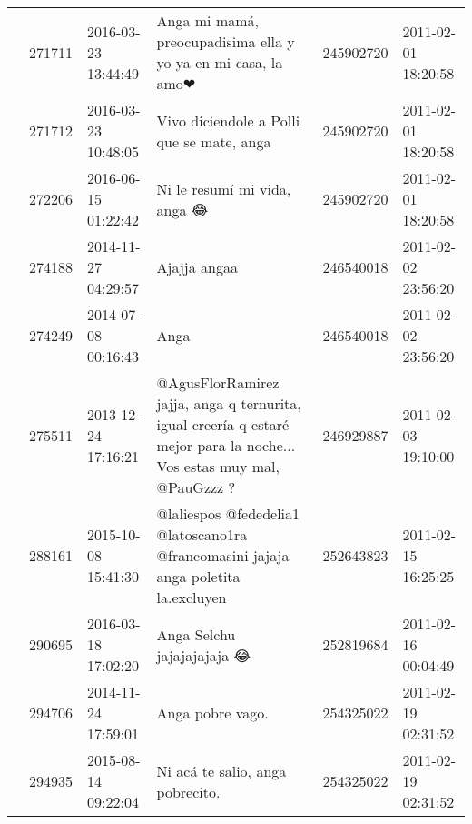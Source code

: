 \begin{tabular}{llllrl}
           & 271711  & 2016-03-23 13:44:49 &                                                                                Anga mi mamá, preocupadisima ella y yo ya en mi casa, la amo❤ &   245902720 & 2011-02-01 18:20:58 \\
           & 271712  & 2016-03-23 10:48:05 &                                                                                                    Vivo diciendole a Polli que se mate, anga &   245902720 & 2011-02-01 18:20:58 \\
           & 272206  & 2016-06-15 01:22:42 &                                                                                                                 Ni le resumí mi vida, anga 😂 &   245902720 & 2011-02-01 18:20:58 \\
           & 274188  & 2014-11-27 04:29:57 &                                                                                                                                 Ajajja angaa &   246540018 & 2011-02-02 23:56:20 \\
           & 274249  & 2014-07-08 00:16:43 &                                                                                                                                         Anga &   246540018 & 2011-02-02 23:56:20 \\
           & 275511  & 2013-12-24 17:16:21 &                        @AgusFlorRamirez jajja, anga q ternurita, igual creería q estaré mejor para la noche... Vos estas muy mal, @PauGzzz ? &   246929887 & 2011-02-03 19:10:00 \\
           & 288161  & 2015-10-08 15:41:30 &                                                          @laliespos @fededelia1 @latoscano1ra @francomasini jajaja anga poletita la.excluyen &   252643823 & 2011-02-15 16:25:25 \\
           & 290695  & 2016-03-18 17:02:20 &                                                                                                                   Anga Selchu jajajajajaja 😂 &   252819684 & 2011-02-16 00:04:49 \\
           & 294706  & 2014-11-24 17:59:01 &                                                                                                                             Anga pobre vago. &   254325022 & 2011-02-19 02:31:52 \\
           & 294935  & 2015-08-14 09:22:04 &                                                                                                             Ni acá te salio, anga pobrecito. &   254325022 & 2011-02-19 02:31:52 \\

\end{tabular}
